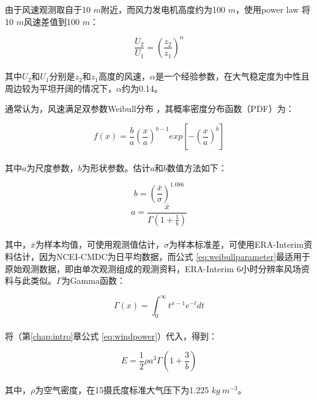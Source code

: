 由于风速观测取自于10 $m$附近，而风力发电机高度约为100 $m$，使用power law \citep{peterson1978on}将10 $m$风速差值到100 $m$：

\begin{equation} \label{eq:powerlaw}
\frac{U_{2}}{U_{1}} = \left( \frac{z_{2}}{z_{1}} \right)^{\alpha}
\end{equation} ~\\
其中$U_{2}$和$U_{1}$分别是$z_{2}$和$z_{1}$高度的风速，$\alpha$是一个经验参数，在大气稳定度为中性且周边较为平坦开阔的情况下，$\alpha$约为0.14。

通常认为，风速满足双参数Weibull分布 \citep{pryor2010climate}，其概率密度分布函数（PDF）为：

\begin{equation} \label{eq:weibull}
f(x) = \frac{b}{a} \left( \frac{x}{a} \right)^{b-1} exp \left[-\left(\frac{x}{a} \right)^{b} \right]
\end{equation} ~\\
其中$a$为尺度参数，$b$为形状参数。估计$a$和$b$数值方法如下\citep{monahan2006the1,monahan2006the2}：

\begin{equation} \label{eq:weibullparameter}
b = \left(\frac{\bar{x}}{\sigma} \right)^{1.086}
\end{equation}  
\vspace*{1ex}  
\begin{equation} \label{eq:weibullparameter2}
a = \frac{\bar{x}}{\Gamma \left(1 + \frac{1}{b} \right)}
\end{equation} ~\\
其中，$\bar{x}$为样本均值，可使用观测值估计，$\sigma$为样本标准差，可使用ERA-Interim资料估计，因为NCEI-CMDC为日平均数据，而公式 \ref{eq:weibullparameter}最适用于原始观测数据，即由单次观测组成的观测资料，ERA-Interim 6小时分辨率风场资料与此类似。$\Gamma$为Gamma函数：

\begin{equation} \label{eq:gammafunction}
\Gamma(x) = \int_{0}^{\infty} t^{x - 1} e^{-t} dt 
\end{equation} ~\\
将（第\ref{chap:intro}章公式  \ref{eq:windpower}）代入，得到：

\begin{equation} \label{eq:windpowerwithweibull}
E = \frac{1}{2} \rho a^{3} \Gamma \left( 1 + \frac{3}{b} \right)
\end{equation} ~\\
其中，$\rho$为空气密度，在15摄氏度标准大气压下为1.225 $kg ~ m^{-3}$。

